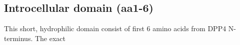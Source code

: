 \subsection{Introcellular domain (aa1-6)}

This short, hydrophilic domain consist of first 6 amino acids from DPP4 N-terminus. The exact 